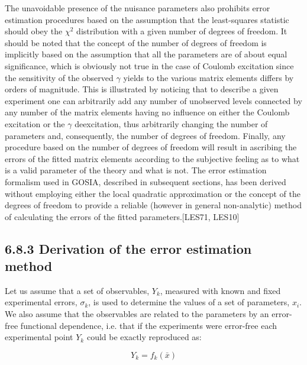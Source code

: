 \documentclass[10pt]{article}
\begin{document}
The unavoidable presence of the nuisance parameters also prohibits error estimation procedures based on the assumption that the least-squares statistic should obey the $\chi^{2}$ distribution with a given number of degrees of freedom. It should be noted that the concept of the number of degrees of freedom is implicitly based on the assumption that all the parameters are of about equal significance, which is obviously not true in the case of Coulomb excitation since the sensitivity of the observed $\gamma$ yields to the various matrix elements differs by orders of magnitude. This is illustrated by noticing that to describe a given experiment one can arbitrarily add any number of unobserved levels connected by any number of the matrix elements having no influence on either the Coulomb excitation or the $\gamma$ deexcitation, thus arbitrarily changing the number of parameters and, consequently, the number of degrees of freedom. Finally, any procedure based on the number of degrees of freedom will result in ascribing the errors of the fitted matrix elements according to the subjective feeling as to what is a valid parameter of the theory and what is not. The error estimation formalism used in GOSIA, described in subsequent sections, has been derived without employing either the local quadratic approximation or the concept of the degrees of freedom to provide a reliable (however in general non-analytic) method of calculating the errors of the fitted parameters.[LES71, LES10]

\subsection*{6.8.3 Derivation of the error estimation method}
Let us assume that a set of observables, $Y_{k}$, measured with known and fixed experimental errors, $\sigma_{k}$, is used to determine the values of a set of parameters, $x_{i}$. We also assume that the observables are related to the parameters by an error-free functional dependence, i.e. that if the experiments were error-free each experimental point $Y_{k}$ could be exactly reproduced as:


\begin{equation*}
Y_{k}=f_{k}(\bar{x}) \tag{6.110}
\end{equation*}
\end{document}

